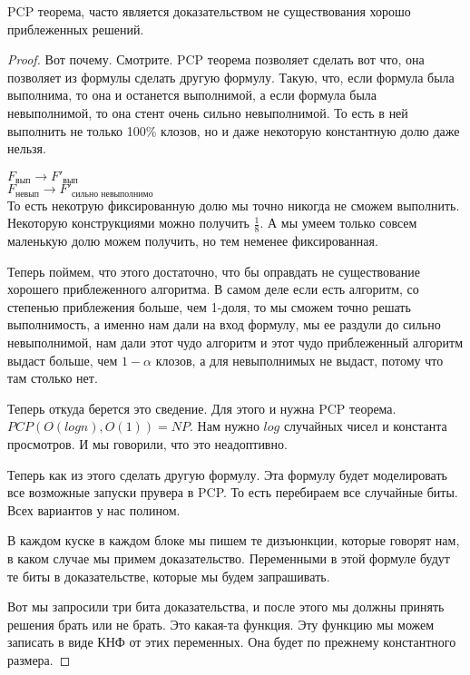 \begin{lemma}
	PCP теорема, часто является доказательством не существования хорошо приблеженных решений.  
\end{lemma}
\begin{proof}
	Вот почему. Смотрите. PCP теорема позволяет сделать вот что, 
	она позволяет из формулы сделать другую формулу.
	Такую, что, если формула была выполнима, то она и останется выполнимой, 
	а если формула была невыполнимой, то она стент очень сильно невыполнимой. То есть 
	в ней выполнить не только 100\% клозов, но и даже некоторую константную долю даже нельзя. 

	$F_{\text{вып}} \to F'_{\text{вып}}$\\
	$F_{\text{невып}} \to F'_{\text{сильно невыполнимо}}$\\ 

	То есть некотрую фиксированную долю мы точно никогда не сможем выполнить. Некоторую конструкциями можно
	получить $\frac{1}{8}$. А мы умеем только совсем маленькую долю можем получить, но тем неменее фиксированная.

       	Теперь поймем, что этого достаточно, что бы оправдать не существование хорошего приблеженного алгоритма. В
       	самом деле если есть алгоритм, со степенью приблежения больше, чем 1-доля, то мы сможем точно решать выполнимость,
       	а именно нам дали на вход формулу, мы ее раздули до сильно невыполнимой, нам дали этот чудо алгоритм и этот
       	чудо приблеженный алгоритм выдаст больше, чем $1-\alpha$ клозов, а для невыполнимых не выдаст, потому что там столько нет.

	Теперь откуда берется это сведение. 
	Для этого и нужна PCP теорема. $PCP(O(log n), O(1)) = NP$. Нам нужно $log$ случайных чисел и константа просмотров. И мы говорили, 
	что это неадоптивно. 

	Теперь как из этого сделать другую формулу. Эта формулу будет моделировать все возможные запуски прувера в PCP. То есть 
	перебираем все случайные биты. Всех вариантов у нас полином. 

	В каждом куске в каждом блоке мы пишем те дизъюнкции, которые говорят нам, в каком случае мы примем доказательство. 
	Переменными в этой формуле будут те биты в доказательстве, которые мы будем запрашивать. 

	Вот мы запросили три бита доказательства, и после этого мы должны принять решения брать или не брать. Это какая-та 
	функция. Эту функцию мы можем записать в виде КНФ от этих переменных. Она будет по прежнему константного размера. 


\end{proof}
